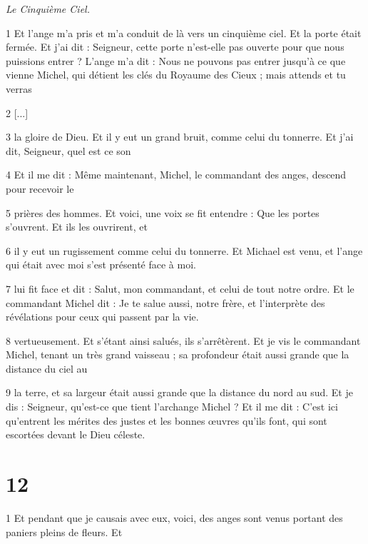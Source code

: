 \par \textit{Le Cinquième Ciel.}

\par 1 Et l'ange m'a pris et m'a conduit de là vers un cinquième ciel. Et la porte était fermée. Et j'ai dit : Seigneur, cette porte n'est-elle pas ouverte pour que nous puissions entrer ? L'ange m'a dit : Nous ne pouvons pas entrer jusqu'à ce que vienne Michel, qui détient les clés du Royaume des Cieux ; mais attends et tu verras

\par 2 [...]

\par 3 la gloire de Dieu. Et il y eut un grand bruit, comme celui du tonnerre. Et j'ai dit, Seigneur, quel est ce son

\par 4 Et il me dit : Même maintenant, Michel, le commandant des anges, descend pour recevoir le

\par 5 prières des hommes. Et voici, une voix se fit entendre : Que les portes s'ouvrent. Et ils les ouvrirent, et

\par 6 il y eut un rugissement comme celui du tonnerre. Et Michael est venu, et l'ange qui était avec moi s'est présenté face à moi.

\par 7 lui fit face et dit : Salut, mon commandant, et celui de tout notre ordre. Et le commandant Michel dit : Je te salue aussi, notre frère, et l'interprète des révélations pour ceux qui passent par la vie.

\par 8 vertueusement. Et s'étant ainsi salués, ils s'arrêtèrent. Et je vis le commandant Michel, tenant un très grand vaisseau ; sa profondeur était aussi grande que la distance du ciel au

\par 9 la terre, et sa largeur était aussi grande que la distance du nord au sud. Et je dis : Seigneur, qu'est-ce que tient l'archange Michel ? Et il me dit : C'est ici qu'entrent les mérites des justes et les bonnes œuvres qu'ils font, qui sont escortées devant le Dieu céleste.

\chapter{12}

\par 1 Et pendant que je causais avec eux, voici, des anges sont venus portant des paniers pleins de fleurs. Et

